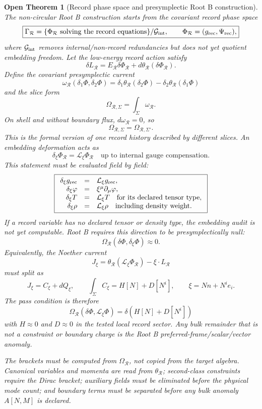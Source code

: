 \documentclass[11pt]{article}
\newtheorem{openthm}{Open Theorem}
\begin{document}
\begin{openthm}[Record phase space and presymplectic Root B construction]
The non-circular Root B construction starts from the covariant record phase
space
\[
\boxed{
\Gamma_{\mathcal R}
=
\{\Phi_{\mathcal R}\ {\rm solving\ the\ record\ equations}\}/\mathcal G_{\rm int},
\qquad
\Phi_{\mathcal R}=(g_{\rm rec},\Psi_{\rm rec}),
}
\]
where \(\mathcal G_{\rm int}\) removes internal/non-record redundancies but
does not yet quotient embedding freedom.  Let the low-energy record action
satisfy
\[
\boxed{
\delta L_{\mathcal R}
=
E_{\mathcal R}\delta\Phi_{\mathcal R}
+
d\theta_{\mathcal R}(\delta\Phi_{\mathcal R}).
}
\]
Define the covariant presymplectic current
\[
\boxed{
\omega_{\mathcal R}(\delta_1\Phi,\delta_2\Phi)
=
\delta_1\theta_{\mathcal R}(\delta_2\Phi)
-
\delta_2\theta_{\mathcal R}(\delta_1\Phi)
}
\]
and the slice form
\[
\boxed{
\Omega_{\mathcal R,\Sigma}
=
\int_\Sigma \omega_{\mathcal R}.
}
\]
On shell and without boundary flux, \(d\omega_{\mathcal R}=0\), so
\[
\boxed{
\Omega_{\mathcal R,\Sigma}
=
\Omega_{\mathcal R,\Sigma'}.
}
\]
This is the formal version of one record history described by different
slices.  An embedding deformation acts as
\[
\boxed{
\delta_\xi\Phi_{\mathcal R}
=
\mathcal L_\xi\Phi_{\mathcal R}
\quad
\text{up to internal gauge compensation}.
}
\]
This statement must be evaluated field by field:
\[
\boxed{
\begin{array}{rcl}
\delta_\xi g_{\rm rec} &=& {\cal L}_\xi g_{\rm rec},\\
\delta_\xi \varphi &=& \xi^\mu\partial_\mu\varphi,\\
\delta_\xi T &=& {\cal L}_\xi T\quad\text{for its declared tensor type},\\
\delta_\xi \rho &=& {\cal L}_\xi \rho\quad\text{including density weight}.
\end{array}
}
\]
If a record variable has no declared tensor or density type, the embedding
audit is not yet computable.
Root B requires this direction to be presymplectically null:
\[
\boxed{
\Omega_{\mathcal R}(\delta\Phi,\delta_\xi\Phi)\approx0.
}
\]
Equivalently, the Noether current
\[
\boxed{
J_\xi
=
\theta_{\mathcal R}(\mathcal L_\xi\Phi_{\mathcal R})
-
\xi\cdot L_{\mathcal R}
}
\]
must split as
\[
\boxed{
J_\xi=C_\xi+dQ_\xi,
\qquad
\int_\Sigma C_\xi=H[N]+D[N^i],
\qquad
\xi=Nn+N^ie_i.
}
\]
The pass condition is therefore
\[
\boxed{
\Omega_{\mathcal R}(\delta\Phi,\mathcal L_\xi\Phi)
=
\delta\!\left(H[N]+D[N^i]\right)
}
\]
with \(H\approx0\) and \(D\approx0\) in the tested local record sector.  Any
bulk remainder that is not a constraint or boundary charge is the Root B
preferred-frame/scalar/vector anomaly.

\medskip\noindent
The brackets must be computed from \(\Omega_{\mathcal R}\), not copied from the
target algebra.  Canonical variables and momenta are read from
\(\theta_{\mathcal R}\); second-class constraints require the Dirac bracket;
auxiliary fields must be eliminated before the physical mode count; and
boundary terms must be separated before any bulk anomaly \(A[N,M]\) is
declared.
\end{openthm}
\end{document}

